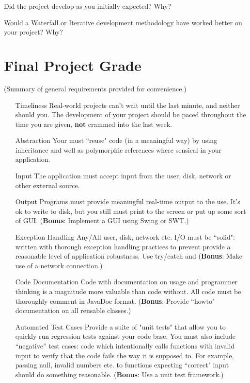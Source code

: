 \documentclass[10pt]{article}
\begin{document}
Did the project develop as you initially expected? Why?

\vspace{5cm}

Would a Waterfall or Iterative development methodology have worked better on your project? Why?

\vspace{5cm}



\pagebreak
\section{Final Project Grade}

(Summary of general requirements provided for convenience.)

\begin{itemize}
\item[Timeliness] Real-world projects can't wait until the last minute, and neither should you. The development of your project should be paced throughout the time you are given, {\bf not} crammed into the last week.
\item[Abstraction] Your must ``reuse" code (in a meaningful way) by using inheritance and well as polymorphic references where sensical in your application.
\item[Input] The application must accept input from the user, disk, network or other external source.
\item[Output] Programs must provide meaningful real-time output to the use. It's ok to write to disk, but you still must print to the screen or put up some sort of GUI. ({\bf Bonus}: Implement a GUI using Swing or SWT.)
\item[Exception Handling] Any/All user, disk, network etc. I/O must be ``solid": written with thorough exception handling practices to prevent provide a reasonable level of application robustness. Use try/catch and ({\bf Bonus}: Make use of a network connection.)
\item[Code Documentation] Code with documentation on usage and programmer thinking is a magnitude more valuable than code without. All code must be thoroughly comment in JavaDoc format. ({\bf Bonus}: Provide ``howto" documentation on all reusable classes.)
\item[Automated Test Cases] Provide a suite of "unit tests" that allow you to quickly run regression tests against your code base. You must also include ``negative'' test cases: code which intentionally calls functions with invalid input to verify that the code fails the way it is supposed to. For example, passing null, invalid numbers etc. to functions expecting ``correct" input should do something reasonable. ({\bf Bonus}: Use a unit test framework.) 
\end{itemize}
\end{document}
